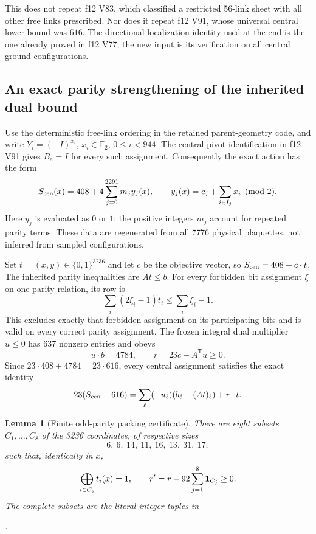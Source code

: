 \documentclass[11pt,oneside]{article}
\newtheorem{lemma}[theorem]{Lemma}
\begin{document}
This does not repeat f12 V83, which classified a restricted
56-link sheet with all other free links prescribed. Nor does
it repeat f12 V91, whose universal central lower bound was
\(616\). The directional localization identity used at the
end is the one already proved in f12 V77; the new input is
its verification on all central ground configurations.

\subsection{An exact parity strengthening of the inherited dual bound}

Use the deterministic free-link ordering in the retained
parent-geometry code, and write \(Y_i=(-I)^{x_i}\),
\(x_i\in\mathbb F_2\), \(0\le i<944\). The central-pivot
identification in f12 V91 gives \(B_e=I\) for every such
assignment. Consequently the exact action has the form
\begin{equation}\label{eq:f13v4-central-action}
 S_{\rm cen}(x)=408+4\sum_{j=0}^{2291}m_j y_j(x),\qquad
 y_j(x)=c_j+\sum_{i\in I_j}x_i\pmod 2 .
\end{equation}
Here \(y_j\) is evaluated as \(0\) or \(1\);
the positive integers \(m_j\) account for repeated parity
terms. These data are regenerated from all 7776 physical
plaquettes, not inferred from sampled configurations.

Set \(t=(x,y)\in\{0,1\}^{3236}\) and let \(c\) be the
objective vector, so \(S_{\rm cen}=408+c\cdot t\).
The inherited parity inequalities are \(At\le b\).
For every forbidden bit assignment \(\xi\) on one parity
relation, its row is
\[
 \sum_i(2\xi_i-1)t_i\le\sum_i\xi_i-1 .
\]
This excludes exactly that forbidden assignment on its
participating bits and is valid on every correct parity
assignment. The frozen integral dual multiplier \(u\le0\)
has 637 nonzero entries and obeys
\[
 u\cdot b=4784,\qquad r=23c-A^{\mathsf T}u\ge0 .
\]
Since \(23\cdot408+4784=23\cdot616\), every central
assignment satisfies the exact identity
\begin{equation}\label{eq:f13v4-dual-identity}
 23(S_{\rm cen}-616)
 =\sum_\ell(-u_\ell)(b_\ell-(At)_\ell)+r\cdot t .
\end{equation}

\begin{lemma}[Finite odd-parity packing certificate]
\label{lem:f13v4-packing}
There are eight subsets \(C_1,\ldots,C_8\) of the 3236
coordinates, of respective sizes
\[
 6,\ 6,\ 14,\ 11,\ 16,\ 13,\ 31,\ 17,
\]
such that, identically in \(x\),
\[
 \bigoplus_{i\in C_j}t_i(x)=1,\qquad
 r'=r-92\sum_{j=1}^8{\bf1}_{C_j}\ge0.
\]
The complete subsets are the literal integer tuples in
\begin{center}\small
{}.
\end{center}
\end{lemma}
\end{document}
